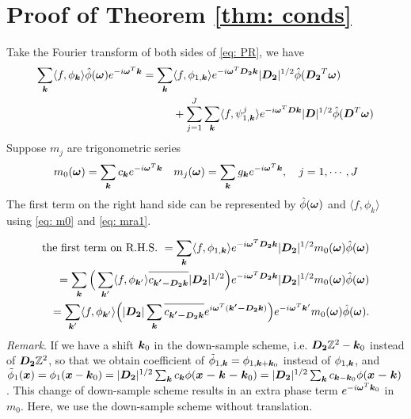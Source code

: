 \section{Proof of Theorem \ref{thm: conds}}\label{app: cond-thm}
Take the Fourier transform of both sides of \eqref{eq: PR}, we have 
\begin{align*}
\sum_{\boldsymbol{k}}\langle f,\phi_{\boldsymbol{k}}\rangle\hat{\phi}(\boldsymbol{\omega})e^{-i\boldsymbol{\omega}^T\boldsymbol{k}} = \sum_{\boldsymbol{k}}&\langle f,\phi_{1,\boldsymbol{k}}\rangle e^{-i\boldsymbol{\omega}^T\boldsymbol{D_2k}}|\boldsymbol{D_2}|^{1/2}\hat{\phi}(\boldsymbol{D_2}^T\boldsymbol{\omega}) \\
&+ \sum_{j=1}^J\sum_{\boldsymbol{k}}\langle f,\psi^j_{1,\boldsymbol{k}}\rangle e^{-i\boldsymbol{\omega}^T\boldsymbol{Dk}}|\boldsymbol{D}|^{1/2}\hat{\phi}(\boldsymbol{D}^T\boldsymbol{\omega})
\end{align*}
Suppose $m_j$ are trigonometric series
\begin{align}\label{eq: mra1}
m_0(\boldsymbol{\omega}) = \sum_{\boldsymbol{k}} c_{\boldsymbol{k}}e^{-i \boldsymbol{\omega}^T\boldsymbol{k}} \quad
m_j(\boldsymbol{\omega}) = \sum_{\boldsymbol{k}} g_{\boldsymbol{k}}e^{-i \boldsymbol{\omega}^T\boldsymbol{k}},\quad j=1,\cdots,J
\end{align}
The first term on the right hand side can be represented by $\hat{\phi}(\boldsymbol{\omega})$ and $\langle f,\phi_k\rangle$ using \eqref{eq: m0} and \eqref{eq: mra1}.

\begin{align*}
\text{the first term on R.H.S. } = \sum_{\V{k}}\langle f,\phi_{1,\V{k}}\rangle e^{-i\V{\omega}^T\V{D_2k}}|\V{D_2}|^{1/2}m_0(\V{\omega})\hat{\phi}(\V{\omega}) \\= \sum_{\V{k}}\Big(\sum_{\V{k}'}\langle f,\phi_{\V{k}'}\rangle\overlinespace{c_{\V{k'-D_2k}}}|\V{D_2}|^{1/2}\Big)e^{-i\V{\omega}^T\V{D_2k}}|\V{D_2}|^{1/2}m_0(\V{\omega})\hat{\phi}(\V{\omega})\\
=\sum_{\V{k}'}\langle f,\phi_{\V{k}'}\rangle\Big(|\V{D_2}|\sum_{\V{k}}\overlinespace{c_{\V{k'-D_2k}}}e^{i\V{\omega}^T(\V{k'-D_2k})}\Big)e^{-i\V{\omega} ^T\V{k}'} m_0(\V{\omega})\hat{\phi}(\V{\omega}).
\end{align*}
{\it Remark}.
If we have a shift $\boldsymbol{k}_0$ in the down-sample scheme, i.e. $\boldsymbol{D_2}\mathbb{Z}^2 - \boldsymbol{k}_0$ instead of $\boldsymbol{D_2}\mathbb{Z}^2$, so that we obtain coefficient of $\tilde{\phi}_{1,\boldsymbol{k}} = \phi_{1,\boldsymbol{k}+\boldsymbol{k}_0}$ instead of $\phi_{1,\boldsymbol{k}}$, and $\tilde{\phi}_1(\boldsymbol{x}) =\phi_1(\boldsymbol{x}-\boldsymbol{k}_0)= |\boldsymbol{D_2}|^{1/2}\sum_{\boldsymbol{k}}c_{\boldsymbol{k}}\phi(\boldsymbol{x-k-k}_0) = |\boldsymbol{D_2}|^{1/2}\sum_{\boldsymbol{k}}c_{\boldsymbol{k}-\boldsymbol{k}_0}\phi(\boldsymbol{x-k})$. This change of down-sample scheme results in an extra phase term $e^{-i\boldsymbol{\omega}^T \boldsymbol{k}_0}$ in $m_0$. Here, we use the down-sample scheme without translation.

